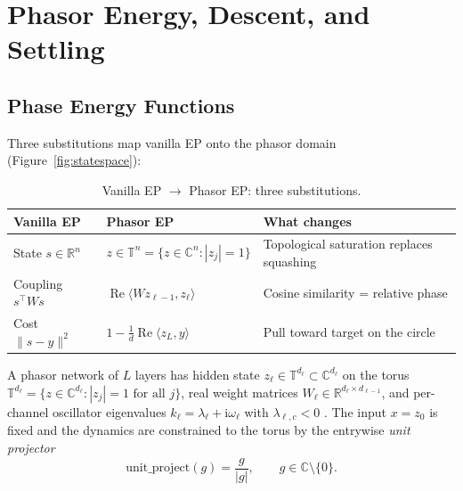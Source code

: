 \documentclass[11pt]{article}
\newcommand{\R}{\mathbb{R}}
\newcommand{\C}{\mathbb{C}}
\newcommand{\T}{\mathbb{T}}
\newcommand{\im}{\mathrm{i}}
\newcommand{\unitproject}{\mathrm{unit\_project}}
\DeclareMathOperator{\Real}{Re}
\begin{document}
\section{Phasor Energy, Descent, and Settling}\label{sec:energy-cost}

\subsection{Phase Energy Functions}\label{ssec:phase-energy}

Three substitutions map vanilla EP onto the phasor domain (Figure~\ref{fig:statespace}):

\begin{table}[ht]
\centering
\caption{Vanilla EP $\to$ Phasor EP: three substitutions.}
\label{tab:three-subs}
\begin{tabular}{@{}lll@{}}
\toprule
Vanilla EP & Phasor EP & What changes \\
\midrule
State $s \in \R^n$ & $z \in \T^n = \{z\in\C^n : |z_j|=1\}$ & Topological saturation replaces squashing \\
Coupling $s^\top W s$ & $\Real\langle W z_{\ell-1}, z_\ell \rangle$ & Cosine similarity = relative phase \\
Cost $\|s-y\|^2$ & $1 - \frac{1}{d}\Real\langle z_L, y \rangle$ & Pull toward target on the circle \\
\bottomrule
\end{tabular}
\end{table}

A phasor network of $L$ layers has hidden state $z_\ell \in \T^{d_\ell} \subset \C^{d_\ell}$ on the torus $\T^{d_\ell} = \{z\in\C^{d_\ell} : |z_j|=1 \text{ for all } j\}$, real weight matrices $W_\ell \in \R^{d_\ell \times d_{\ell-1}}$, and per-channel oscillator eigenvalues $k_\ell = \lambda_\ell + \im\omega_\ell$ with $\lambda_{\ell,c} < 0$ \citep{olin2021deep}. The input $x = z_0$ is fixed and the dynamics are constrained to the torus by the entrywise \emph{unit projector}
\begin{equation}
\unitproject(g) = \frac{g}{|g|}, \qquad g \in \C \setminus \{0\}.
\end{equation}
\end{document}
